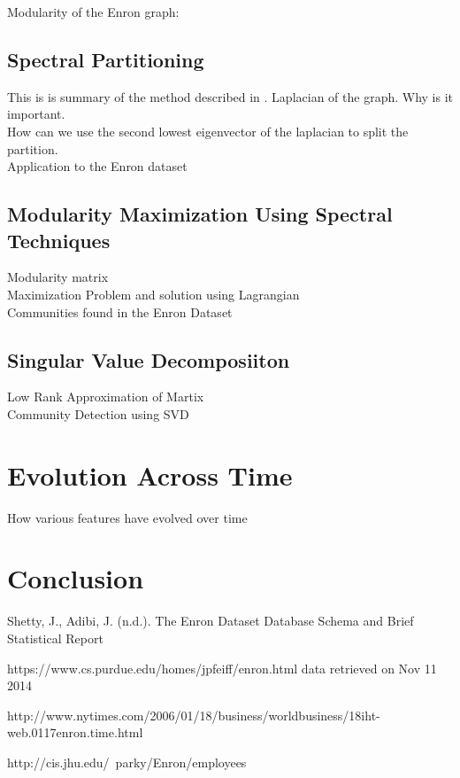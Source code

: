 \documentclass[12pt]{article}
\begin{document}
	Modularity of the Enron graph:
	
	\subsection{Spectral Partitioning} 
		This is is summary of the method described in \cite{networkBook}. 
		Laplacian of the graph. Why is it important.  \\
		How can we use the second lowest eigenvector of the laplacian to split the partition. \\
		Application to the Enron dataset \\
	\subsection{Modularity Maximization Using Spectral Techniques} 	
		Modularity matrix \\
		Maximization Problem and solution using Lagrangian \\
		Communities found in the Enron Dataset 
	\subsection{Singular Value Decomposiiton}
		Low Rank Approximation of Martix \\
		Community Detection using SVD \\

\section{Evolution Across Time} How various  features have evolved over time

\section{Conclusion}

\begin{thebibliography}{9}

Shetty, J., Adibi, J. (n.d.). The Enron Dataset
Database Schema and Brief Statistical Report

https://www.cs.purdue.edu/homes/jpfeiff/enron.html
data retrieved on Nov 11 2014

http://www.nytimes.com/2006/01/18/business/worldbusiness/18iht-web.0117enron.time.html

http://cis.jhu.edu/~parky/Enron/employees

\end{thebibliography}
\end{document}
